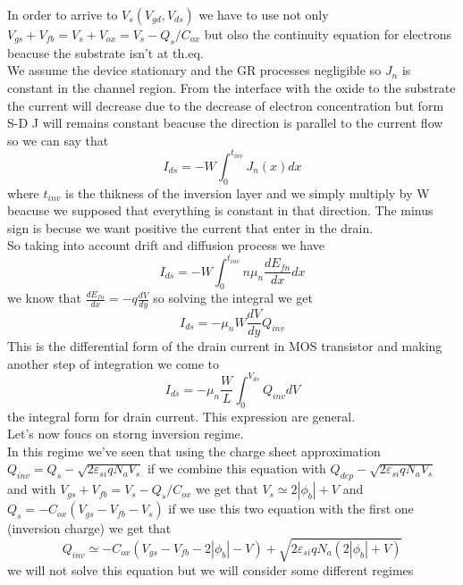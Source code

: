 In order to arrive to $V_s(V_{gd},V_{ds})$ we have to use not only $V_{gs}+V_{fb}=V_{s}+V_{ox}=V_{s}-Q_s/C_{ox}$ but olso the continuity equation for electrons beacuse the substrate isn't at th.eq.\\
We assume the device stationary and the GR processes negligible so $J_n$ is constant in the channel region. From the interface with the oxide to the substrate the current will decrease due to the decrease of electron concentration but form S-D J will remains constant beacuse the direction is parallel to the current flow so we can say that
\begin{equation}
I_{ds}=-W\int^{t_{inv}}_0 J_n(x)dx
\end{equation}
where $t_{inv}$ is the thikness of the inversion layer and we simply multiply by W beacuse we supposed that everything is constant in that direction. The minus sign is becuse we want positive the current that enter in the drain.\\
So taking into account drift and diffusion process we have 
\begin{equation}
I_{ds}=-W\int^{t_{inv}}_0 n\mu_n \frac{dE_{fn}}{dx} dx
\end{equation}
we know that $\frac{dE_{fn}}{dx}=-q \frac{dV}{dy}$ so solving the integral we get
\begin{equation}
I_{ds}=-\mu_nW \frac{dV}{dy}Q_{inv}
\end{equation}
This is the differential form of the drain current in MOS transistor and making another step of integration we come to 
\begin{equation}
I_{ds}=-\mu_n\frac{W}{L}\int^{V_{ds}}_0Q_{inv}dV
\end{equation}
the integral form for drain current. This expression are general.\\
Let's now foucs on storng inversion regime.\\
In this regime we've seen that using the charge sheet approximation $Q_{inv}=Q_s-\sqrt{2\varepsilon_{si}qN_aV_s}$ if we combine this equation with $Q_{dep}-\sqrt{2\varepsilon_{si}qN_aV_s}$ and with $V_{gs}+V_{fb}=V_{s}-Q_s/C_{ox}$ we get that $V_s\simeq2|\phi_b|+V$ and $Q_s=-C_{ox}(V_{gs}-V_{fb}-V_{s})$ if we use this two equation with the first one (inversion charge) we get that
\begin{equation}
Q_{inv}\simeq -C_{ox}(V_{gs}-V_{fb}-2|\phi_b|-V)+\sqrt{2\varepsilon_{si}qN_a(2|\phi_b|+V)}
\end{equation}
we will not solve this equation but we will consider some different regimes


